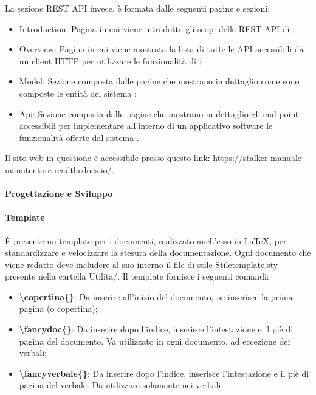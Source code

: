 La sezione REST API invece, è formata dalle seguenti pagine e sezioni:
\begin{itemize}
    \item Introduction: Pagina in cui viene introdotto gli scopi delle REST API di \NomeProgetto{};
    \item Overview: Pagina in cui viene mostrata la lista di tutte le API accessibili da un client HTTP per utilizzare le funzionalità di \NomeProgetto{};
    \item Model: Sezione composta dalle pagine che mostrano in dettaglio come sono composte le entità del sistema \NomeProgetto{};
    \item Api: Sezione composta dalle pagine che mostrano in dettaglio gli end-point accessibili per implementare all'interno di un applicativo software le funzionalità offerte dal sistema \NomeProgetto{}.
\end{itemize}

Il sito web in questione è accessibile presso questo link: \href{https://stalker-manuale-manutentore.readthedocs.io/}{https://stalker-manuale-manutentore.readthedocs.io/}.

\paragraph*{Progettazione e Sviluppo}

\paragraph*{Template}
È presente un template per i documenti, realizzato anch'esso in \LaTeX{}, per standardizzare e velocizzare la stesura della documentazione.
Ogni documento che viene redatto deve includere al suo interno il file di stile Stiletemplate.sty presente nella cartella Utilita/.
Il template fornisce i seguenti comandi:
\begin{itemize}
\item \textbf{\textbackslash copertina\{\}}: Da inserire all'inizio del documento, ne inserisce la prima pagina (o copertina);
\item \textbf{\textbackslash fancydoc\{\}}: Da inserire dopo l'indice, inserisce l'intestazione e il piè di pagina del documento. Va utilizzato in ogni documento, ad eccezione dei verbali;
\item \textbf{\textbackslash fancyverbale\{\}}: Da inserire dopo l'indice, inserisce l'intestazione e il piè di pagina del verbale. Da utilizzare solamente nei verbali.
\end{itemize}

